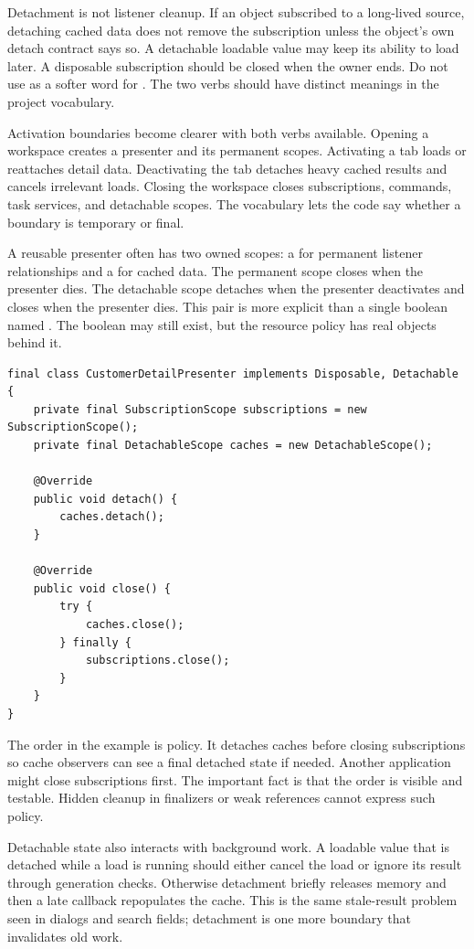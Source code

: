 Detachment is not listener cleanup. If an object subscribed to a long-lived
source, detaching cached data does not remove the subscription unless the
object's own detach contract says so. A detachable loadable value may keep its
ability to load later. A disposable subscription should be closed when the
owner ends. Do not use  as a softer word for . The two
verbs should have distinct meanings in the project vocabulary.

Activation boundaries become clearer with both verbs available. Opening a
workspace creates a presenter and its permanent scopes. Activating a tab loads
or reattaches detail data. Deactivating the tab detaches heavy cached results
and cancels irrelevant loads. Closing the workspace closes subscriptions,
commands, task services, and detachable scopes. The vocabulary lets the code
say whether a boundary is temporary or final.

A reusable presenter often has two owned scopes: a  for
permanent listener relationships and a  for cached data.
The permanent scope closes when the presenter dies. The detachable scope
detaches when the presenter deactivates and closes when the presenter dies.
This pair is more explicit than a single boolean named . The
boolean may still exist, but the resource policy has real objects behind it.

\begin{lstlisting}[caption={A reusable presenter has close and detach paths.}]
final class CustomerDetailPresenter implements Disposable, Detachable {
    private final SubscriptionScope subscriptions = new SubscriptionScope();
    private final DetachableScope caches = new DetachableScope();

    @Override
    public void detach() {
        caches.detach();
    }

    @Override
    public void close() {
        try {
            caches.close();
        } finally {
            subscriptions.close();
        }
    }
}
\end{lstlisting}

The order in the example is policy. It detaches caches before closing
subscriptions so cache observers can see a final detached state if needed.
Another application might close subscriptions first. The important fact is that
the order is visible and testable. Hidden cleanup in finalizers or weak
references cannot express such policy.

Detachable state also interacts with background work. A loadable value that is
detached while a load is running should either cancel the load or ignore its
result through generation checks. Otherwise detachment briefly releases memory
and then a late callback repopulates the cache. This is the same stale-result
problem seen in dialogs and search fields; detachment is one more boundary that
invalidates old work.

